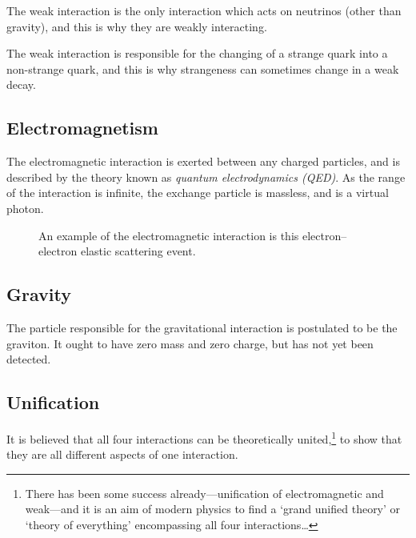 The weak interaction is the only interaction which acts on neutrinos (other than gravity), and this is why they are weakly interacting.

The weak interaction is responsible for the changing of a strange quark into a non-strange quark, and this is why strangeness can sometimes change in a weak decay.

\subsection{Electromagnetism}

The electromagnetic interaction is exerted between any charged particles, and is described by the theory known as \emph{quantum electrodynamics (QED)}.  As the range of the interaction is infinite, the exchange particle is massless, and is a virtual photon.

\begin{figure}
\caption{An example of the electromagnetic interaction is this electron--electron elastic scattering event.}
\end{figure}

\subsection{Gravity}
The particle responsible for the gravitational interaction is postulated to be the graviton.  It ought to have zero mass and zero charge, but has not yet been detected.

\subsection{Unification}
It is believed that all four interactions can be theoretically united,\footnote{There has been some success already---unification of electromagnetic and weak---and it is an aim of modern physics to find a `grand unified theory' or `theory of everything' encompassing all four interactions\ldots} to show that they are all different aspects of one interaction.
